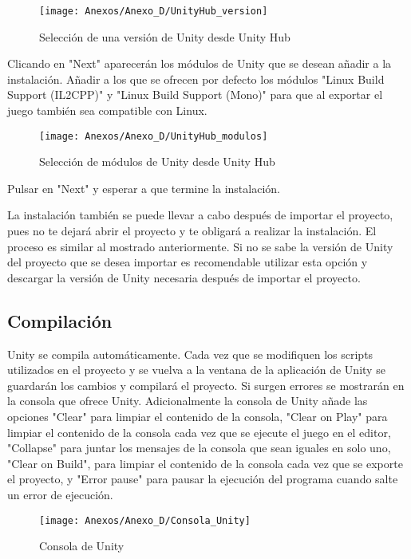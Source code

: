 \clearpage
\begin{figure}[h]
\centering
\texttt{[image: Anexos/Anexo\_D/UnityHub\_version]}
\caption{Selección de una versión de Unity desde Unity Hub}
\end{figure}

Clicando en "Next" aparecerán los módulos de Unity que se desean añadir a la instalación. Añadir a los que se ofrecen por defecto los módulos "Linux Build Support (IL2CPP)" y "Linux Build Support (Mono)"
para que al exportar el juego también sea compatible con Linux.

\begin{figure}[h]
\centering
\texttt{[image: Anexos/Anexo\_D/UnityHub\_modulos]}
\caption{Selección de módulos de Unity desde Unity Hub}
\end{figure}

Pulsar en "Next" y esperar a que termine la instalación.

La instalación también se puede llevar a cabo después de importar el proyecto, pues no te dejará abrir el proyecto y te obligará a realizar la instalación. El proceso es similar al mostrado anteriormente. Si no se sabe la versión de Unity del proyecto que se desea importar es recomendable utilizar esta opción y descargar la versión de Unity necesaria después de importar el proyecto.

\subsection{Compilación}
Unity se compila automáticamente. Cada vez que se modifiquen los scripts utilizados en el proyecto y se vuelva a la ventana de la aplicación de Unity se guardarán los cambios y compilará el proyecto. Si surgen errores se mostrarán en la consola que ofrece Unity.
 Adicionalmente la consola de Unity añade las opciones "Clear" para limpiar el contenido de la consola, "Clear on Play" para limpiar el contenido de la consola cada vez que se ejecute el juego en el editor, "Collapse" para juntar los mensajes de la consola que sean iguales en solo uno, "Clear on Build", para limpiar el contenido de la consola cada vez que se exporte el proyecto, y "Error pause" para pausar la ejecución del programa cuando salte un error de ejecución.

\begin{figure}[h]
\centering
\texttt{[image: Anexos/Anexo\_D/Consola\_Unity]}
\caption{Consola de Unity}
\end{figure}


